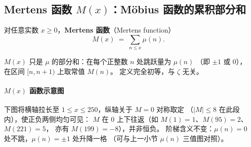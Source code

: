 \subsection{Mertens 函数 \texorpdfstring{$M(x)$}{M(x)}：Möbius 函数的累积部分和}\label{subsec:mertens_function}
 
\begin{definition}{}{}
对任意实数 $x \ge 0$，\textbf{Mertens 函数}（Mertens function）
\[
  M(x) \;=\; \sum_{n \le x} \mu(n).
\]
\end{definition}

$M(x)$ 只是 $\mu$ 的部分和：在每个正整数 $n$ 处跳跃量为 $\mu(n)$
（即 $\pm 1$ 或 $0$），在区间 $[n,n+1)$ 上取常值 $M(n)$。
定义完全初等，与 $\zeta$ 无关。

\paragraph{$M(x)$ 函数示意图}
下图将横轴拉长至 $1\le x\le 250$，纵轴关于 $M=0$ 对称取定
（$\lvert M\rvert\le 8$ 在此段内），使正负两侧均匀可见：
$M$ 在 $0$ 上下往返（如 $M(1)=1$、$M(95)=2$、$M(221)=5$，
亦有 $M(199)=-8$），并非恒负。
阶梯含义不变：$\mu(n)=0$ 处不跳，$\mu(n)=\pm 1$ 处升降一格
（可与上一小节 $\mu(n)$ 三值图对照）。

